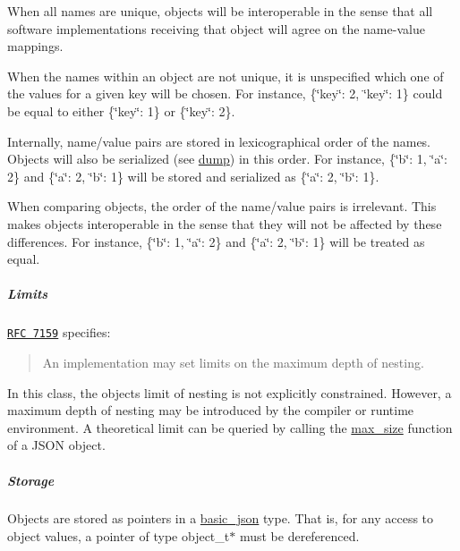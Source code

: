\begin{DoxyItemize}
\item When all names are unique, objects will be interoperable in the sense that all software implementations receiving that object will agree on the name-\/value mappings.
\item When the names within an object are not unique, it is unspecified which one of the values for a given key will be chosen. For instance, {\ttfamily \{\char`\"{}key\char`\"{}\+: 2, \char`\"{}key\char`\"{}\+: 1\}} could be equal to either {\ttfamily \{\char`\"{}key\char`\"{}\+: 1\}} or {\ttfamily \{\char`\"{}key\char`\"{}\+: 2\}}.
\item Internally, name/value pairs are stored in lexicographical order of the names. Objects will also be serialized (see \hyperlink{classnlohmann_1_1basic__json_a864a99beff1d81e760c9391688a857be}{dump}) in this order. For instance, {\ttfamily \{\char`\"{}b\char`\"{}\+: 1, \char`\"{}a\char`\"{}\+: 2\}} and {\ttfamily \{\char`\"{}a\char`\"{}\+: 2, \char`\"{}b\char`\"{}\+: 1\}} will be stored and serialized as {\ttfamily \{\char`\"{}a\char`\"{}\+: 2, \char`\"{}b\char`\"{}\+: 1\}}.
\item When comparing objects, the order of the name/value pairs is irrelevant. This makes objects interoperable in the sense that they will not be affected by these differences. For instance, {\ttfamily \{\char`\"{}b\char`\"{}\+: 1, \char`\"{}a\char`\"{}\+: 2\}} and {\ttfamily \{\char`\"{}a\char`\"{}\+: 2, \char`\"{}b\char`\"{}\+: 1\}} will be treated as equal.
\end{DoxyItemize}

\subparagraph*{Limits}

\href{http://rfc7159.net/rfc7159}{\tt R\+FC 7159} specifies\+: \begin{quote}
An implementation may set limits on the maximum depth of nesting. \end{quote}


In this class, the object\textquotesingle{}s limit of nesting is not explicitly constrained. However, a maximum depth of nesting may be introduced by the compiler or runtime environment. A theoretical limit can be queried by calling the \hyperlink{classnlohmann_1_1basic__json_a2f47d3c6a441c57dd2be00449fbb88e1}{max\+\_\+size} function of a J\+S\+ON object.

\subparagraph*{Storage}

Objects are stored as pointers in a \hyperlink{classnlohmann_1_1basic__json}{basic\+\_\+json} type. That is, for any access to object values, a pointer of type {\ttfamily object\+\_\+t$\ast$} must be dereferenced.

